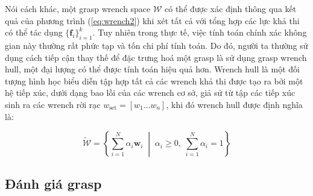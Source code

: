 Nói cách khác, một grasp wrench space $\mathcal{W}$ có thể được xác định thông qua kết quả của phương trình (\ref{eq:wrench2}) khi xét tất cả với tổng hợp các lực khả thi có thể tác dụng  $\{\mathbf{f}_i\}_{i=1}^k$. Tuy nhiên trong thực tế, việc tính toán chính xác không gian này thường rất phức tạp và tốn chi phí tính toán. Do đó, người ta thường sử dụng cách tiếp cận thay thế để đặc trưng hoá một grasp là sử dụng grasp wrench hull, một đại lượng có thể được tính toán hiệu quả hơn. Wrench hull là một đối tượng hình học biểu diễn tập hợp tất cả các wrench khả thi được tạo ra bởi một hệ tiếp xúc, dưới dạng bao lồi của các wrench cơ sở, giả sử từ tập các tiếp xúc sinh ra các wrench rời rạc $w_\text{set} = [w_1 \ldots w_n]$, khi đó wrench hull được định nghĩa là:

\begin{equation}
    \widetilde{\mathcal{W}} = \left\{\sum_{i=1}^{N} \alpha_i \mathbf{w}_i \;\middle|\;\alpha_i \ge 0,\;\sum_{i=1}^{N} \alpha_i = 1\right\}
\label{eq:gwh}
\end{equation}

\subsection{Đánh giá grasp}

